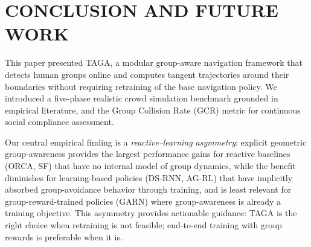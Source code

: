 \section{CONCLUSION AND FUTURE WORK}



% 
This paper presented TAGA, a modular group-aware navigation framework that detects human groups online and computes tangent trajectories around their boundaries without requiring retraining of the base navigation policy. We introduced a five-phase realistic crowd simulation benchmark grounded in empirical literature, and the Group Collision Rate (GCR) metric for continuous social compliance assessment.

Our central empirical finding is a \textit{reactive--learning asymmetry}: explicit geometric group-awareness provides the largest performance gains for reactive baselines (ORCA, SF) that have no internal model of group dynamics, while the benefit diminishes for learning-based policies (DS-RNN, AG-RL) that have implicitly absorbed group-avoidance behavior through training, and is least relevant for group-reward-trained policies (GARN) where group-awareness is already a training objective. This asymmetry provides actionable guidance: TAGA is the right choice when retraining is not feasible; end-to-end training with group rewards is preferable when it is.

